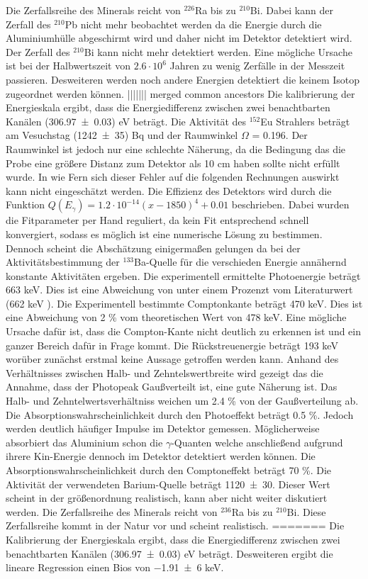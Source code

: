 Die Zerfallsreihe des Minerals reicht von $^{226}$Ra bis zu $^{210}$Bi. Dabei kann der Zerfall des $^{210}$Pb nicht mehr beobachtet werden da die Energie durch die Aluminiumhülle abgeschirmt wird und daher nicht im Detektor detektiert wird. Der Zerfall des $^{210}$Bi kann nicht mehr detektiert werden. Eine mögliche Ursache ist bei der Halbwertszeit von $2.6 \cdot 10^6$ Jahren zu wenig Zerfälle in der Messzeit passieren. Desweiteren werden noch andere Energien detektiert die keinem Isotop zugeordnet werden können. 
||||||| merged common ancestors
Die kalibrierung der Energieskala ergibt, dass die Energiedifferenz zwischen zwei benachtbarten Kanälen (\num{306.97 +- 0.03}) eV beträgt. Die Aktivität des $^{152}$Eu Strahlers beträgt am Vesuchstag (\num{1242 +- 35}) Bq und der Raumwinkel $\Omega$ = 0.196. Der Raumwinkel ist jedoch nur eine schlechte Näherung, da die Bedingung das die Probe eine größere Distanz zum Detektor als 10 cm haben sollte nicht erfüllt wurde. In wie Fern sich dieser Fehler auf die folgenden Rechnungen auswirkt kann nicht eingeschätzt werden. Die Effizienz des Detektors wird durch die Funktion $Q(E_\gamma) = 1.2 \cdot 10^{-14} (x-1850)^4 +0.01$ beschrieben. Dabei wurden die Fitparameter per Hand reguliert, da kein Fit entsprechend schnell konvergiert, sodass es möglich ist eine numerische Lösung zu bestimmen. Dennoch scheint die Abschätzung einigermaßen gelungen da bei der Aktivitätsbestimmung der $^{133}$Ba-Quelle für die verschieden Energie annähernd konstante Aktivitäten ergeben. Die experimentell ermittelte Photoenergie beträgt 663 keV. Dies ist eine Abweichung von unter einem Prozenzt vom Literaturwert (662 keV \cite{Cs}). Die Experimentell bestimmte Comptonkante beträgt 470 keV. Dies ist eine Abweichung von 2 \% vom theoretischen Wert von 478 keV. Eine mögliche Ursache dafür ist, dass die Compton-Kante nicht deutlich zu erkennen ist und ein ganzer Bereich dafür in Frage kommt. Die Rückstreuenergie beträgt 193 keV worüber zunächst erstmal keine Aussage getroffen werden kann. Anhand des Verhältnisses zwischen Halb- und Zehntelswertbreite wird gezeigt das die Annahme, dass der Photopeak Gaußverteilt ist, eine gute Näherung ist. Das Halb- und Zehntelwertsverhältniss weichen um 2.4 \% von der Gaußverteilung ab. Die Absorptionswahrscheinlichkeit durch den Photoeffekt beträgt 0.5 \%. Jedoch werden deutlich häufiger Impulse im Detektor gemessen. Möglicherweise absorbiert das Aluminium schon die $\gamma$-Quanten welche anschließend aufgrund ihrere Kin-Energie dennoch im Detektor detektiert werden können. Die Absorptionswahrscheinlichkeit durch den Comptoneffekt beträgt 70 \%. Die Aktivität der verwendeten Barium-Quelle beträgt \num{1120 +- 30}. Dieser Wert scheint in der größenordnung realistisch, kann aber nicht weiter diskutiert werden. Die Zerfallsreihe des Minerals reicht von $^{236}$Ra bis zu $^{210}$Bi. Diese Zerfallsreihe kommt in der Natur vor und scheint realistisch.
=======
Die Kalibrierung der Energieskala ergibt, dass die Energiedifferenz zwischen zwei benachtbarten Kanälen (\num{306.97 +- 0.03}) eV beträgt. Desweiteren ergibt die lineare Regression einen Bios von \num{-1.91 +- 6} keV. 

